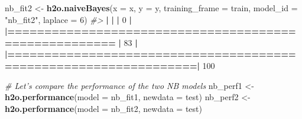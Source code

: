 \documentclass[]{book}
\newenvironment{Shaded}{\begin{snugshade}}{\end{snugshade}}
\newcommand{\CommentTok}[1]{\textcolor[rgb]{0.56,0.35,0.01}{\textit{#1}}}
\newcommand{\DataTypeTok}[1]{\textcolor[rgb]{0.13,0.29,0.53}{#1}}
\newcommand{\DecValTok}[1]{\textcolor[rgb]{0.00,0.00,0.81}{#1}}
\newcommand{\ErrorTok}[1]{\textcolor[rgb]{0.64,0.00,0.00}{\textbf{#1}}}
\newcommand{\KeywordTok}[1]{\textcolor[rgb]{0.13,0.29,0.53}{\textbf{#1}}}
\newcommand{\NormalTok}[1]{#1}
\newcommand{\OperatorTok}[1]{\textcolor[rgb]{0.81,0.36,0.00}{\textbf{#1}}}
\newcommand{\StringTok}[1]{\textcolor[rgb]{0.31,0.60,0.02}{#1}}
\begin{document}
\begin{Shaded}
\begin{Highlighting}[]
\NormalTok{nb_fit2 <-}\StringTok{ }\KeywordTok{h2o.naiveBayes}\NormalTok{(}\DataTypeTok{x =}\NormalTok{ x,}
                          \DataTypeTok{y =}\NormalTok{ y,}
                          \DataTypeTok{training_frame =}\NormalTok{ train,}
                          \DataTypeTok{model_id =} \StringTok{"nb_fit2"}\NormalTok{,}
                          \DataTypeTok{laplace =} \DecValTok{6}\NormalTok{)}
\CommentTok{#> }
  \OperatorTok{|}\StringTok{                                                                       }
\StringTok{  }\ErrorTok{|}\StringTok{                                                                 }\ErrorTok{|}\StringTok{   }\DecValTok{0}\NormalTok{%}
  \OperatorTok{|}\StringTok{                                                                       }
\StringTok{  }\ErrorTok{|======================================================}\StringTok{           }\ErrorTok{|}\StringTok{  }\DecValTok{83}\NormalTok{%}
  \OperatorTok{|}\StringTok{                                                                       }
\StringTok{  }\ErrorTok{|=================================================================|}\StringTok{ }\DecValTok{100}\NormalTok{%}

\CommentTok{# Let's compare the performance of the two NB models}
\NormalTok{nb_perf1 <-}\StringTok{ }\KeywordTok{h2o.performance}\NormalTok{(}\DataTypeTok{model =}\NormalTok{ nb_fit1,}
                            \DataTypeTok{newdata =}\NormalTok{ test)}
\NormalTok{nb_perf2 <-}\StringTok{ }\KeywordTok{h2o.performance}\NormalTok{(}\DataTypeTok{model =}\NormalTok{ nb_fit2,}
                            \DataTypeTok{newdata =}\NormalTok{ test)}

}}}
\end{Highlighting}
\end{Shaded}
\end{document}
